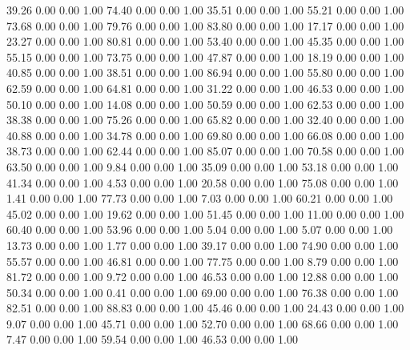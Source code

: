    39.26   0.00   0.00   1.00
   74.40   0.00   0.00   1.00
   35.51   0.00   0.00   1.00
   55.21   0.00   0.00   1.00
   73.68   0.00   0.00   1.00
   79.76   0.00   0.00   1.00
   83.80   0.00   0.00   1.00
   17.17   0.00   0.00   1.00
   23.27   0.00   0.00   1.00
   80.81   0.00   0.00   1.00
   53.40   0.00   0.00   1.00
   45.35   0.00   0.00   1.00
   55.15   0.00   0.00   1.00
   73.75   0.00   0.00   1.00
   47.87   0.00   0.00   1.00
   18.19   0.00   0.00   1.00
   40.85   0.00   0.00   1.00
   38.51   0.00   0.00   1.00
   86.94   0.00   0.00   1.00
   55.80   0.00   0.00   1.00
   62.59   0.00   0.00   1.00
   64.81   0.00   0.00   1.00
   31.22   0.00   0.00   1.00
   46.53   0.00   0.00   1.00
   50.10   0.00   0.00   1.00
   14.08   0.00   0.00   1.00
   50.59   0.00   0.00   1.00
   62.53   0.00   0.00   1.00
   38.38   0.00   0.00   1.00
   75.26   0.00   0.00   1.00
   65.82   0.00   0.00   1.00
   32.40   0.00   0.00   1.00
   40.88   0.00   0.00   1.00
   34.78   0.00   0.00   1.00
   69.80   0.00   0.00   1.00
   66.08   0.00   0.00   1.00
   38.73   0.00   0.00   1.00
   62.44   0.00   0.00   1.00
   85.07   0.00   0.00   1.00
   70.58   0.00   0.00   1.00
   63.50   0.00   0.00   1.00
    9.84   0.00   0.00   1.00
   35.09   0.00   0.00   1.00
   53.18   0.00   0.00   1.00
   41.34   0.00   0.00   1.00
    4.53   0.00   0.00   1.00
   20.58   0.00   0.00   1.00
   75.08   0.00   0.00   1.00
    1.41   0.00   0.00   1.00
   77.73   0.00   0.00   1.00
    7.03   0.00   0.00   1.00
   60.21   0.00   0.00   1.00
   45.02   0.00   0.00   1.00
   19.62   0.00   0.00   1.00
   51.45   0.00   0.00   1.00
   11.00   0.00   0.00   1.00
   60.40   0.00   0.00   1.00
   53.96   0.00   0.00   1.00
    5.04   0.00   0.00   1.00
    5.07   0.00   0.00   1.00
   13.73   0.00   0.00   1.00
    1.77   0.00   0.00   1.00
   39.17   0.00   0.00   1.00
   74.90   0.00   0.00   1.00
   55.57   0.00   0.00   1.00
   46.81   0.00   0.00   1.00
   77.75   0.00   0.00   1.00
    8.79   0.00   0.00   1.00
   81.72   0.00   0.00   1.00
    9.72   0.00   0.00   1.00
   46.53   0.00   0.00   1.00
   12.88   0.00   0.00   1.00
   50.34   0.00   0.00   1.00
    0.41   0.00   0.00   1.00
   69.00   0.00   0.00   1.00
   76.38   0.00   0.00   1.00
   82.51   0.00   0.00   1.00
   88.83   0.00   0.00   1.00
   45.46   0.00   0.00   1.00
   24.43   0.00   0.00   1.00
    9.07   0.00   0.00   1.00
   45.71   0.00   0.00   1.00
   52.70   0.00   0.00   1.00
   68.66   0.00   0.00   1.00
    7.47   0.00   0.00   1.00
   59.54   0.00   0.00   1.00
   46.53   0.00   0.00   1.00
